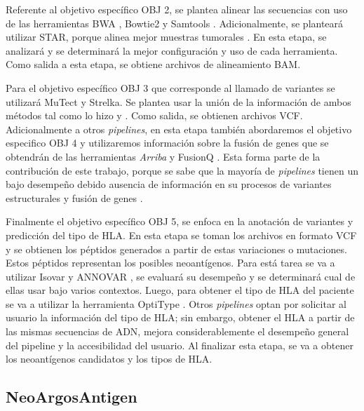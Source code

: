 \documentclass[a4paper,11pt]{article}
\begin{document}
Referente al objetivo específico OBJ 2, se plantea alinear las secuencias con uso de las herramientas BWA \cite{li2009fast}, Bowtie2 \cite{langmead2019scaling} y Samtools \cite{danecek2021twelve}. Adicionalmente, se planteará utilizar STAR, porque alinea mejor muestras tumorales \cite{rubinsteyn2018computational}. En esta etapa, se analizará y se determinará la mejor configuración y uso de cada herramienta. Como salida a esta etapa, se obtiene archivos de alineamiento BAM.



Para el objetivo específico OBJ 3 que corresponde al llamado de variantes se utilizará MuTect y Strelka. Se plantea usar la unión de la información de ambos métodos tal como lo hizo \cite{zhou2023prioritizing} y \cite{rubinsteyn2018computational}. Como salida, se obtienen archivos VCF. Adicionalmente a otros \textit{pipelines}, en esta etapa también abordaremos el objetivo especifico OBJ 4 y utilizaremos información sobre la fusión de genes que se obtendrán de las herramientas \textit{Arriba} \cite{uhrig2021accurate} y FusionQ \cite{liu2013fusionq}. Esta forma parte de la contribución de este trabajo, porque se sabe que la mayoría de \textit{pipelines} tienen un bajo desempeño debido ausencia de información en su procesos de variantes estructurales y fusión de genes \cite{wood2020neoepiscope}. 



Finalmente el objetivo específico OBJ 5, se enfoca en la anotación de variantes y predicción del tipo de HLA. En esta etapa se toman los archivos en formato VCF y se obtienen los péptidos generados a partir de estas variaciones o mutaciones. Estos péptidos representan los posibles neoantígenos. Para está tarea se va a utilizar Isovar \cite{isovar2023} y ANNOVAR \cite{wang2010annovar}, se evaluará su desempeño y se determinará cual de ellas usar bajo varios contextos. Luego, para obtener el tipo de HLA del paciente se va a utilizar la herramienta OptiType \cite{szolek2014optitype}. Otros \textit{pipelines} optan por solicitar al usuario la información del tipo de HLA; sin embargo, obtener el HLA a partir de las mismas secuencias de ADN, mejora considerablemente el desempeño general del pipeline y la accesibilidad del usuario. Al  finalizar esta etapa, se va a obtener los neoantígenos candidatos y los tipos de HLA.


\subsection{NeoArgosAntigen}
\end{document}
